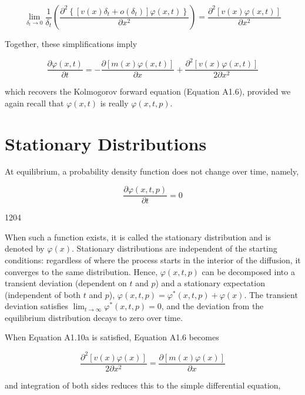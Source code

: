 \documentclass{article}
\begin{document}
\begin{equation}
\lim_{\delta_{t}\to0}\frac{1}{\delta_{t}}\left(\frac{\partial^{2}\left\{\left[v(x)\delta_{t}+o(\delta_{t})\right]\varphi(x,t)\right\}}{\partial x^{2}}\right)=\frac{\partial^{2}[v(x)\varphi(x,t)]}{\partial x^{2}}
\end{equation}

Together, these simplifications imply

\begin{equation}
\frac{\partial\varphi(x,t)}{\partial t}=-\frac{\partial[m(x)\varphi(x,t)]}{\partial x}+\frac{\partial^{2}[v(x)\varphi(x,t)]}{2\partial x^{2}}
\end{equation}

which recovers the Kolmogorov forward equation (Equation A1.6), provided we again recall that  $ \varphi(x,t) $ is really  $ \varphi(x,t,p) $.

\section{Stationary Distributions}
At equilibrium, a probability density function does not change over time, namely,

\begin{equation}
\frac{\partial\varphi(x,t,p)}{\partial t}=0
\end{equation}

1204

When such a function exists, it is called the stationary distribution and is denoted by  $ \varphi(x) $. Stationary distributions are independent of the starting conditions: regardless of where the process starts in the interior of the diffusion, it converges to the same distribution. Hence,  $ \varphi(x, t, p) $ can be decomposed into a transient deviation (dependent on  $ t $ and  $ p $) and a stationary expectation (independent of both  $ t $ and  $ p $),  $ \varphi(x, t, p) = \varphi^*(x, t, p) + \varphi(x) $. The transient deviation satisfies  $ \lim_{t \to \infty} \varphi^*(x, t, p) = 0 $, and the deviation from the equilibrium distribution decays to zero over time.

When Equation A1.10a is satisfied, Equation A1.6 becomes

\begin{equation}
\frac{\partial^{2}[v(x)\varphi(x)]}{2\partial x^{2}}=\frac{\partial[m(x)\varphi(x)]}{\partial x}
\end{equation}

and integration of both sides reduces this to the simple differential equation,
\end{document}
